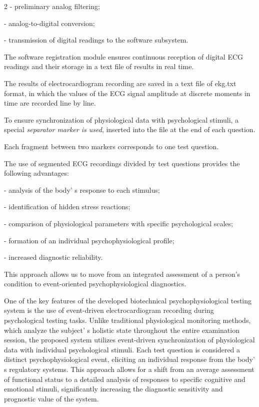 \begin{multicols}{2}
- preliminary analog filtering;

- analog-to-digital conversion;

- transmission of digital readings to the software subsystem.

The software registration module ensures continuous reception of digital
ECG readings and their storage in a text file of results in real time.

The results of electrocardiogram recording are saved in a text file of
ekg.txt format, in which the values of the ECG signal amplitude at
discrete moments in time are recorded line by line.

To ensure synchronization of physiological data with psychological
stimuli, a special \emph{separator marker is used}, inserted into the
file at the end of each question.

Each fragment between two markers corresponds to one test question.

The use of segmented ECG recordings divided by test questions provides
the following advantages:

- analysis of the body' s response to each stimulus;

- identification of hidden stress reactions;

- comparison of physiological parameters with specific psychological
scales;

- formation of an individual psychophysiological profile;

- increased diagnostic reliability.

This approach allows us to move from an integrated assessment of a
person's condition to event-oriented psychophysiological diagnostics.

One of the key features of the developed biotechnical
psychophysiological testing system is the use of event-driven
electrocardiogram recording during psychological testing tasks. Unlike
traditional physiological monitoring methods, which analyze the
subject' s holistic state throughout the entire
examination session, the proposed system utilizes event-driven
synchronization of physiological data with individual psychological
stimuli. Each test question is considered a distinct psychophysiological
event, eliciting an individual response from the body' s
regulatory systems. This approach allows for a shift from an average
assessment of functional status to a detailed analysis of responses to
specific cognitive and emotional stimuli, significantly increasing the
diagnostic sensitivity and prognostic value of the system.


\end{multicols}
